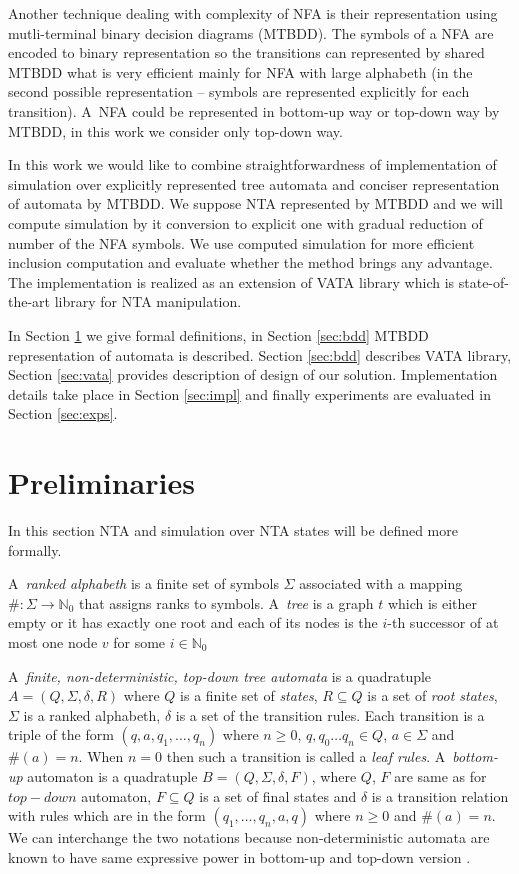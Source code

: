 \documentclass[a4paper, 12pt]{article}
\begin{document}
Another technique dealing with complexity of NFA is their representation using mutli-terminal binary decision diagrams (MTBDD).
The symbols of a NFA are encoded to binary representation so the transitions can represented by shared MTBDD what is very efficient mainly for NFA with large alphabeth
(in the second possible representation -- symbols are represented explicitly for each transition).
A~NFA could be represented in bottom-up way or top-down way by MTBDD, in this work we consider only top-down way.

In this work we would like to combine straightforwardness of implementation of simulation over explicitly
represented tree automata and conciser representation of automata by MTBDD.
We suppose NTA represented by MTBDD and we will compute simulation by it conversion
to explicit one with gradual reduction of number of the NFA symbols.
We use computed simulation for more efficient inclusion computation and evaluate whether the method brings any advantage.
The implementation is realized as an extension of VATA library which is state-of-the-art library for NTA manipulation.

In Section \ref{sec:analysis} we give formal definitions, in Section \ref{sec:bdd} MTBDD representation of automata is described.
Section \ref{sec:bdd} describes VATA library, Section \ref{sec:vata} provides description of design of our solution.
Implementation details take place in Section \ref{sec:impl} and finally experiments are evaluated in Section \ref{sec:exps}.

\section{Preliminaries}
\label{sec:analysis}
In this section NTA and simulation over NTA states will be defined more formally.

A~\emph{ranked alphabeth} is a finite set of symbols $\Sigma$ associated with a mapping $\#: \Sigma \rightarrow \mathbb{N}_0$
that assigns ranks to symbols. A~\emph{tree} is a graph $t$ which is either empty or it has exactly one root and each of its
nodes is the $i$-th successor of at most one node $v$ for some $i \in \mathbb{N}_0$

A~\emph{finite, non-deterministic, top-down tree automata} is a quadratuple $A=(Q, \Sigma, \delta, R)$ where
$Q$ is a finite set of \emph{states}, $R\subseteq Q$ is a set of \emph{root states}, $\Sigma$ is a ranked alphabeth,
$\delta$ is a set of the transition rules.
Each transition is a triple of the form $(q,a,q_1, \ldots, q_n)$ where $n \geq 0$, $q, q_0 \ldots q_n \in Q$, $a \in \Sigma$ and $\#(a) = n$.
When $n = 0$ then such a transition is called a \emph{leaf rules}.
A~\emph{bottom-up} automaton is a quadratuple $B=(Q, \Sigma, \delta, F)$, where $Q$, $F$ are same as for $top-down$ automaton, $F\subseteq Q$
is a set of final states and $\delta$ is a transition relation with rules which are in the form $(q_1,\ldots, q_n,a,q)$ where $n \geq 0$ and $\#(a) = n$.
We can interchange the two notations because non-deterministic automata are known to have same expressive power in bottom-up and top-down version \cite{tata}.
\end{document}
